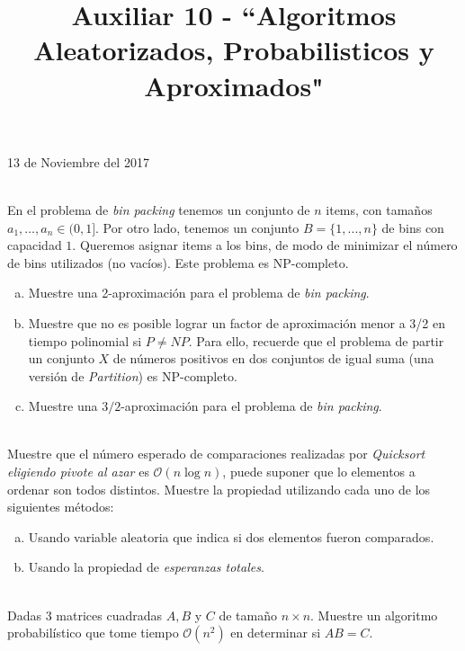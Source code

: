 \documentclass[dcc,uchile]{fcfmcourse}
\title{Auxiliar 10 - ``Algoritmos Aleatorizados, Probabilisticos y Aproximados"}
\theoremstyle{plain}
\theoremstyle{definition}
\begin{document}
\maketitle
\begin{center}
13 de Noviembre del 2017
\end{center}


\vspace{-1ex}


\begin{problems}

\\
En el problema de \textit{bin packing} tenemos un conjunto de $n$ items, con tamaños $a_1, \ldots, a_n \in (0, 1]$. Por otro lado, tenemos un conjunto $B = \{1, ..., n\}$ de bins con capacidad $1$. Queremos asignar items a los bins, de modo de minimizar el número de bins utilizados
(no vacíos). Este problema es NP-completo.
\begin{enumerate}[a)]
    \item Muestre una 2-aproximación para el problema de \textit{bin packing}.
    \item Muestre que no es posible lograr un factor de aproximación menor a 3/2 en tiempo polinomial si $P \not= NP$. Para ello, recuerde que el problema de partir un conjunto $X$ de números positivos en dos conjuntos de igual suma (una versión de \textit{Partition}) es NP-completo.
    \item  Muestre una $3/2$-aproximación para el problema de \textit{bin packing}.
\end{enumerate}
\\
Muestre que el número esperado de comparaciones realizadas por \textit{Quicksort eligiendo pivote al azar} es $\mathcal{O}(n\log{n})$, puede suponer que lo elementos a ordenar son todos distintos. Muestre la propiedad utilizando cada uno de los siguientes métodos:
\begin{enumerate}[a)]
    \item Usando variable aleatoria que indica si dos elementos fueron comparados.
    \item Usando la propiedad de \textit{esperanzas totales}.
\end{enumerate}
\\
Dadas 3 matrices cuadradas $A, B$ y $C$ de tamaño $n\times n$. Muestre un algoritmo probabilístico que tome tiempo $\mathcal{O}(n^2)$ en determinar si $AB = C$.
\end{problems}
\end{document}
